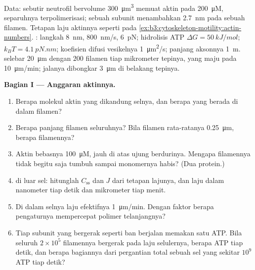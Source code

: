 \begin{problem}
\label{pb:b3:cytoskeleton-motility:1}
Data: sebutir neutrofil bervolume \qty{300}{\micro m^3} memuat aktin pada
\qty{200}{\micro M}, separuhnya terpolimerisasi; sebuah subunit menambahkan
\qty{2.7}{nm} pada sebuah filamen. Tetapan laju aktinnya seperti pada
\cref{ex:b3:cytoskeleton-motility:actin-numbers}. : langkah
\qty{8}{nm}, \qty{800}{nm/s},  \qty{6}{pN}; hidrolisis ATP
$\Delta G = \qty{50}{kJ/mol}$; $k_{B}T = \qty{4.1}{pN.nm}$; koefisien difusi
vesikelnya \qty{1}{\micro m^2/s}; panjang aksonnya \qty{1}{m}.
 selebar \qty{20}{\micro m} dengan $200$ filamen tiap
mikrometer tepinya, yang maju pada \qty{10}{\micro m/min}; jalanya
dibongkar \qty{3}{\micro m} di belakang tepinya.

\medskip
\noindent\textbf{Bagian I --- Anggaran aktinnya.}
\begin{enumerate}
  \item Berapa molekul aktin yang dikandung selnya, dan berapa yang
        berada di dalam filamen?
  \item Berapa panjang filamen seluruhnya? Bila filamen rata-ratanya
        \qty{0.25}{\micro m}, berapa filamennya?
  \item Aktin bebasnya \qty{100}{\micro M}, jauh di atas  ujung berdurinya. Mengapa filamennya tidak begitu saja
        tumbuh sampai monomernya habis? (Dua protein.)
  \item {} di luar sel: hitunglah $C_{\text{ss}}$ dan $J$ dari
        tetapan lajunya, dan laju  dalam nanometer tiap
        detik dan mikrometer tiap menit.
  \item Di dalam selnya laju efektifnya \qty{1}{\micro m/min}. Dengan
        faktor berapa pengaturnya mempercepat polimer telanjangnya?
  \item Tiap subunit yang bergerak seperti ban berjalan memakan satu ATP. Bila
        seluruh $2\times 10^{5}$ filamennya bergerak pada laju selulernya,
        berapa ATP tiap detik, dan berapa bagiannya dari pergantian total
        sebuah sel yang sekitar $10^{9}$ ATP tiap detik?
\end{enumerate}


\end{problem}
